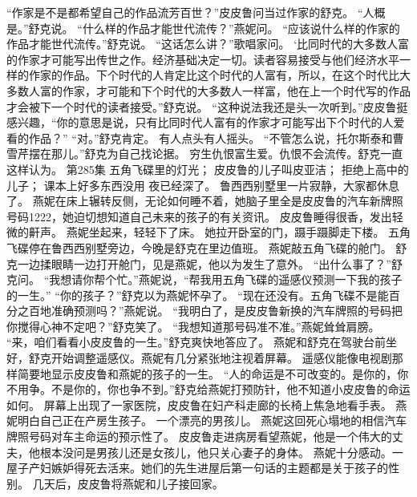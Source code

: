 \documentclass[a4paper,12pt,UTF8,twoside]{ctexbook}
\begin{document}
        “作家是不是都希望自己的作品流芳百世？”皮皮鲁问当过作家的舒克。  
        “人概是。”舒克说。  
        “什么样的作品才能世代流传？”燕妮问。  
        “应该说什么样的作家的作品才能世代流传。”舒克说。  
        “这话怎么讲？”歌唱家问。  
        ‘比同时代的大多数人富的作家才可能写出传世之作。经济基础决定一切。读者容易接受与他们经济水平一样的作家的作品。下个时代的人肯定比这个时代的人富有，所以，在这个时代比大多数人富的作家，才可能和下个时代的大多数人一样富，他在上一个时代写的作品才会被下一个时代的读者接受。”舒克说。  
        “这种说法我还是头一次听到。”皮皮鲁挺感兴趣，“你的意思是说，只有比同时代人富有的作家才可能写出下个时代的人爱看的作品？”  
        “对。”舒克肯定。  
        有人点头有人摇头。  
        “不管怎么说，托尔斯泰和曹雪芹摆在那儿。”舒克为自己找论据。  
        穷生仇恨富生爱。仇恨不会流传。舒克一直这样认为。          第285集  
        五角飞碟里的灯光；  
        皮皮鲁的儿子叫皮亚洁；  
        拒绝上高中的儿子；  
        课本上好多东西没用    
        夜已经深了。  
        鲁西西别墅里一片寂静，大家都休息了。  
        燕妮在床上辗转反侧，无论如何睡不着，她脑子里全是皮皮鲁的汽车新牌照号码1222，她迫切想知道自己未来的孩子的有关资讯。  
        皮皮鲁睡得很香，发出轻微的鼾声。  
        燕妮坐起来，轻轻下了床。  
        她拉开卧室的门，蹑手蹑脚走下楼。  
        五角飞碟停在鲁西西别墅旁边，今晚是舒克在里边值班。  
        燕妮敲五角飞碟的舱门。        
        舒克一边揉眼睛一边打开舱门，见是燕妮，他以为发生了意外。  
        “出什么事了？”舒克问。  
        “我想请你帮个忙。”燕妮说，“帮我用五角飞碟的遥感仪预测一下我的孩子的一生。”  
        “你的孩子？”舒克以为燕妮怀孕了。  
        “现在还没有。五角飞碟不是能百分之百地准确预测吗？”燕妮说。  
        “我明白了，是皮皮鲁新换的汽车牌照的号码把你搅得心神不定吧？”舒克笑了。  
        “我想知道那号码准不准。”燕妮耸耸肩膀。  
        “来，咱们看看小皮皮鲁的一生。”舒克爽快地答应了。  
        燕妮和舒克在驾驶台前坐好，舒克开始调整遥感仪。燕妮有几分紧张地注视着屏幕。  
        遥感仪能像电视剧那样简要地显示皮皮鲁和燕妮的孩子的一生。  
        “人的命运是不可改变的。是你的，你不用争。不是你的，你也争不到。”舒克给燕妮打预防针，他不知道小皮皮鲁的命运如何。  
        屏幕上出现了一家医院，皮皮鲁在妇产科走廊的长椅上焦急地看手表。  
        燕妮明白自己正在产房生孩子。  
        一个漂亮的男孩儿。        
        燕妮这回死心塌地的相信汽车牌照号码对车主命运的预示性了。  
        皮皮鲁走进病房看望燕妮，他是一个伟大的丈夫，他根本没问是男孩儿还是女孩儿，他只关心妻子的身体。  
        燕妮十分感动。一屋子产妇嫉妒得死去活来。她们的先生进屋后第一句话的主题都是关于孩子的性别。  
        几天后，皮皮鲁将燕妮和儿子接回家。  
\end{document}
